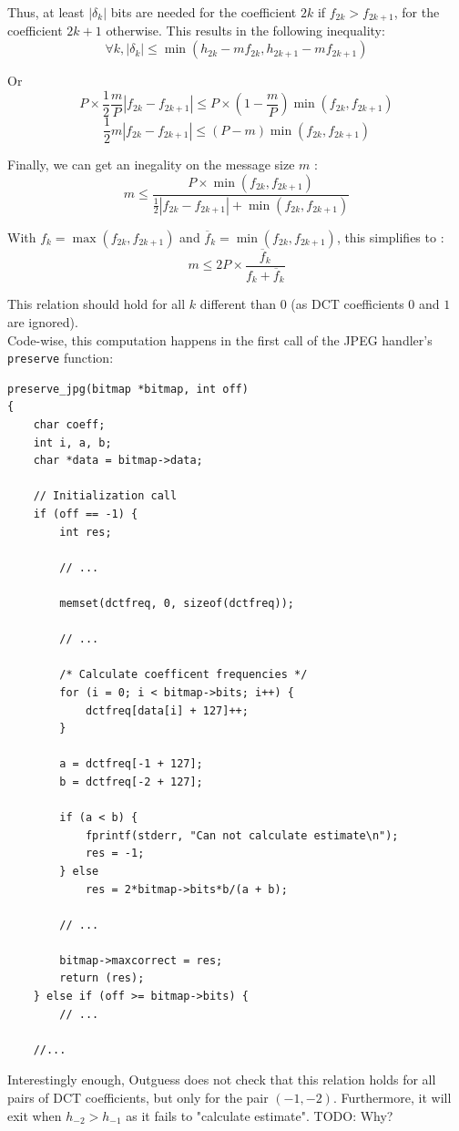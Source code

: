 \documentclass{article}
\begin{document}
Thus, at least $\left|\delta_k\right|$ bits are needed for the coefficient $2k$ if $f_{2k} > f_{2k + 1}$, for the coefficient $2k + 1$ otherwise. This results in the following inequality: \[
	\forall k, \left|\delta_k\right| \le \min(h_{2k} - m f_{2k}, h_{2k + 1} - m f_{2k + 1})
\]

Or \[
	P \times \frac 1 2 \frac m P \left|f_{2k} - f_{2k + 1}\right| \le P \times \left(1 - \frac m P\right) \min(f_{2k}, f_{2k + 1})
\] \[
	\frac 1 2 m \left|f_{2k} - f_{2k + 1}\right| \le \left(P - m\right) \min(f_{2k}, f_{2k + 1})
\]

Finally, we can get an inegality on the message size $m$ : \[
	m \le \frac { P \times \min(f_{2k}, f_{2k + 1}) } { \frac 1 2 \left|f_{2k} - f_{2k + 1}\right| + \min(f_{2k}, f_{2k + 1}) }
\]

With $f_k = \max(f_{2k}, f_{2k + 1})$ and $\overline f_k = \min(f_{2k}, f_{2k + 1})$, this simplifies to : \[
	m \le 2 P \times \frac {\overline f_k} { f_k + \overline f_k }
\]

This relation should hold for all $k$ different than $0$ (as DCT coefficients $0$ and $1$ are ignored). \\

Code-wise, this computation happens in the first call of the JPEG handler's \texttt{preserve} function:
\begin{verbatim}
preserve_jpg(bitmap *bitmap, int off)
{
	char coeff;
	int i, a, b;
	char *data = bitmap->data;
	
	// Initialization call
	if (off == -1) {
		int res;
		
		// ...

		memset(dctfreq, 0, sizeof(dctfreq));
		
		// ...

		/* Calculate coefficent frequencies */
		for (i = 0; i < bitmap->bits; i++) {
			dctfreq[data[i] + 127]++;
		}
		
		a = dctfreq[-1 + 127];
		b = dctfreq[-2 + 127];
		
		if (a < b) {
			fprintf(stderr, "Can not calculate estimate\n");
			res = -1;
		} else
			res = 2*bitmap->bits*b/(a + b);
		
		// ...
		
		bitmap->maxcorrect = res;
		return (res);
	} else if (off >= bitmap->bits) {
		// ...

	//...
\end{verbatim}

Interestingly enough, Outguess does not check that this relation holds for all pairs of DCT coefficients, but only for the pair $(-1, -2)$. Furthermore, it will exit when $h_{-2} > h_{-1}$ as it fails to "calculate estimate". {\color{red} TODO: Why?} \\
\end{document}
